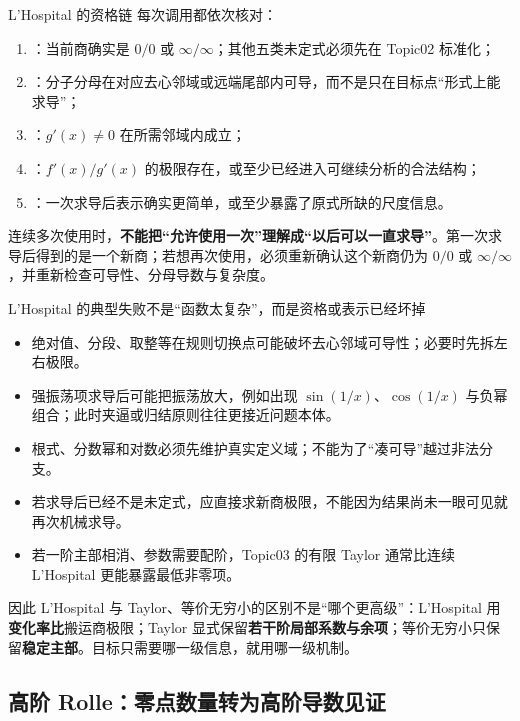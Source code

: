 \documentclass[UTF8,fontset=none,11pt,a4paper]{ctexart}
\begin{document}
\begin{methodbox}{L'Hospital 的资格链}
每次调用都依次核对：
\begin{enumerate}
  \item {}：当前商确实是 $0/0$ 或 $\infty/\infty$；其他五类未定式必须先在 Topic02 标准化；
  \item {}：分子分母在对应去心邻域或远端尾部内可导，而不是只在目标点“形式上能求导”；
  \item {}：$g'(x)\ne0$ 在所需邻域内成立；
  \item {}：$f'(x)/g'(x)$ 的极限存在，或至少已经进入可继续分析的合法结构；
  \item {}：一次求导后表示确实更简单，或至少暴露了原式所缺的尺度信息。
\end{enumerate}
\end{methodbox}

连续多次使用时，\textbf{不能把“允许使用一次”理解成“以后可以一直求导”}。第一次求导后得到的是一个新商；若想再次使用，必须重新确认这个新商仍为 $0/0$ 或 $\infty/\infty$，并重新检查可导性、分母导数与复杂度。

\begin{warnbox}{L'Hospital 的典型失败不是“函数太复杂”，而是资格或表示已经坏掉}
\begin{itemize}
  \item 绝对值、分段、取整等在规则切换点可能破坏去心邻域可导性；必要时先拆左右极限。
  \item 强振荡项求导后可能把振荡放大，例如出现 $\sin(1/x)$、$\cos(1/x)$ 与负幂组合；此时夹逼或归结原则往往更接近问题本体。
  \item 根式、分数幂和对数必须先维护真实定义域；不能为了“凑可导”越过非法分支。
  \item 若求导后已经不是未定式，应直接求新商极限，不能因为结果尚未一眼可见就再次机械求导。
  \item 若一阶主部相消、参数需要配阶，Topic03 的有限 Taylor 通常比连续 L'Hospital 更能暴露最低非零项。
\end{itemize}
\end{warnbox}

因此 L'Hospital 与 Taylor、等价无穷小的区别不是“哪个更高级”：L'Hospital 用\textbf{变化率比}搬运商极限；Taylor 显式保留\textbf{若干阶局部系数与余项}；等价无穷小只保留\textbf{稳定主部}。目标只需要哪一级信息，就用哪一级机制。

\subsection{高阶 Rolle：零点数量转为高阶导数见证}
\end{document}

